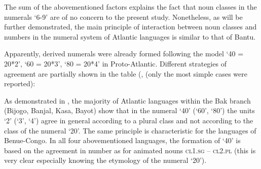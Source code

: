 The sum of the abovementioned factors explains the fact that noun classes in the numerals ‘6-9’ are of no concern to the present study. Nonetheless, as will be further demonstrated, the main principle of interaction between noun classes and numbers in the numeral system of Atlantic languages is similar to that of Bantu. 

Apparently, derived numerals were already formed following the model ‘40 = 20*2’, ‘60 = 20*3’, ‘80 = 20*4’ in Proto-Atlantic. Different strategies of agreement are partially shown in the table (, (only the most simple cases were reported): 

\begin{table}

\caption{\label{tab:1:12} Atlantic languages: noun classes in the derived numerals}

\end{table}


As demonstrated in , the majority of Atlantic languages within the Bak branch (Bijogo, Banjal, Kasa, Bayot) show that in the numeral ‘40’ (‘60’, ‘80’) the units ‘2’ (‘3’, ‘4’) agree in general according to a plural class and not according to the class of the numeral ‘20’. The same principle is characteristic for the languages of Benue-Congo. In all four abovementioned languages, the formation of ‘40’ is based on the agreement in number as for animated nouns  \textsc{cl}1.\textsc{sg} – \textsc{cl}2.\textsc{pl} (this is very clear especially knowing the etymology of the numeral `20'). 

